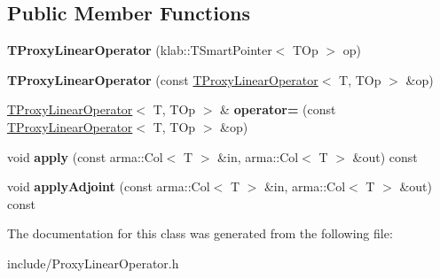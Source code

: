\subsection*{Public Member Functions}
\begin{DoxyCompactItemize}
\item 
{\bfseries T\+Proxy\+Linear\+Operator} (klab\+::\+T\+Smart\+Pointer$<$ T\+Op $>$ op)\hypertarget{classkl1p_1_1TProxyLinearOperator_a3554e6b92737bd3d66ad1bfc31b68ca7}{}\label{classkl1p_1_1TProxyLinearOperator_a3554e6b92737bd3d66ad1bfc31b68ca7}

\item 
{\bfseries T\+Proxy\+Linear\+Operator} (const \hyperlink{classkl1p_1_1TProxyLinearOperator}{T\+Proxy\+Linear\+Operator}$<$ T, T\+Op $>$ \&op)\hypertarget{classkl1p_1_1TProxyLinearOperator_a46a93db68f385376d0980635caed5571}{}\label{classkl1p_1_1TProxyLinearOperator_a46a93db68f385376d0980635caed5571}

\item 
\hyperlink{classkl1p_1_1TProxyLinearOperator}{T\+Proxy\+Linear\+Operator}$<$ T, T\+Op $>$ \& {\bfseries operator=} (const \hyperlink{classkl1p_1_1TProxyLinearOperator}{T\+Proxy\+Linear\+Operator}$<$ T, T\+Op $>$ \&op)\hypertarget{classkl1p_1_1TProxyLinearOperator_a58129fc3ca14048774a4393f892d195d}{}\label{classkl1p_1_1TProxyLinearOperator_a58129fc3ca14048774a4393f892d195d}

\item 
void {\bfseries apply} (const arma\+::\+Col$<$ T $>$ \&in, arma\+::\+Col$<$ T $>$ \&out) const \hypertarget{classkl1p_1_1TProxyLinearOperator_a7f21a7878785be5b01d6a3afbb4a73c1}{}\label{classkl1p_1_1TProxyLinearOperator_a7f21a7878785be5b01d6a3afbb4a73c1}

\item 
void {\bfseries apply\+Adjoint} (const arma\+::\+Col$<$ T $>$ \&in, arma\+::\+Col$<$ T $>$ \&out) const \hypertarget{classkl1p_1_1TProxyLinearOperator_a579bbcb73ede272ecaa4ce3d1acf47d5}{}\label{classkl1p_1_1TProxyLinearOperator_a579bbcb73ede272ecaa4ce3d1acf47d5}

\end{DoxyCompactItemize}


The documentation for this class was generated from the following file\+:\begin{DoxyCompactItemize}
\item 
include/Proxy\+Linear\+Operator.\+h\end{DoxyCompactItemize}
